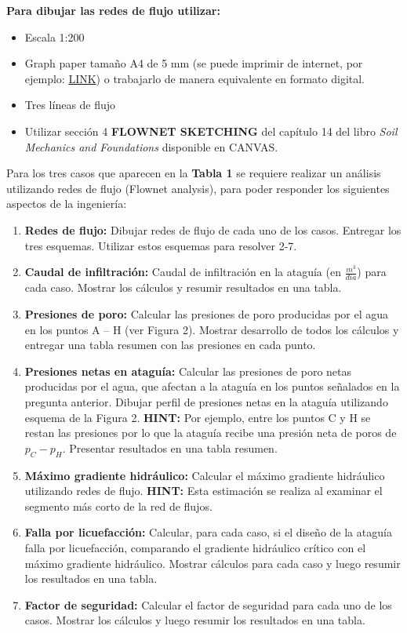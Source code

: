 \documentclass{article} %
\begin{document}
\vspace{0.5cm}

\textbf{Para dibujar las redes de flujo utilizar:}

\begin{itemize}
    \item Escala 1:200
    \item Graph paper tamaño A4 de 5 mm (se puede imprimir de internet, por ejemplo: \href{https://print-graph-paper.com/details/5mm}{LINK}) o trabajarlo de manera equivalente en formato digital.
    \item Tres líneas de flujo
    \item Utilizar sección 4 \textbf{FLOWNET SKETCHING} del capítulo 14 del libro \textit{Soil Mechanics and Foundations} disponible en CANVAS.\\
\end{itemize}

Para los tres casos que aparecen en la \textbf{Tabla 1} se requiere realizar un análisis utilizando redes de flujo (Flownet analysis), para poder responder los siguientes aspectos de la ingeniería:

\begin{enumerate}
    \item \textbf{Redes de flujo:} Dibujar redes de flujo de cada uno de los casos. Entregar los tres esquemas. Utilizar estos esquemas para resolver 2-7.
    \item \textbf{Caudal de infiltración:} Caudal de infiltración en la ataguía (en $\frac{m^3}{dia}$) para cada caso. Mostrar los cálculos y resumir resultados en una tabla.
    \item \textbf{Presiones de poro:} Calcular las presiones de poro producidas por el agua en los puntos A – H (ver Figura 2). Mostrar desarrollo de todos los cálculos y entregar una tabla resumen con las presiones en cada punto.
    \item \textbf{Presiones netas en ataguía:} Calcular las presiones de poro netas producidas por el agua, que afectan a la ataguía en los puntos señalados en la pregunta anterior. Dibujar perfil de presiones netas en la ataguía utilizando esquema de la Figura 2. \textbf{HINT:} Por ejemplo, entre los puntos C y H se restan las presiones por lo que la ataguía recibe una presión neta de poros de $p_C - p_H$. Presentar resultados en una tabla resumen.
    \item \textbf{Máximo gradiente hidráulico:} Calcular el máximo gradiente hidráulico utilizando redes de flujo. \textbf{HINT:} Esta estimación se realiza al examinar el segmento más corto de la red de flujos.
    \item \textbf{Falla por licuefacción:} Calcular, para cada caso, si el diseño de la ataguía falla por licuefacción, comparando el gradiente hidráulico crítico con el máximo gradiente hidráulico. Mostrar cálculos para cada caso y luego resumir los resultados en una tabla.
    \item \textbf{Factor de seguridad:} Calcular el factor de seguridad para cada uno de los casos. Mostrar los cálculos y luego resumir los resultados en una tabla.
\end{enumerate}
\end{document}
